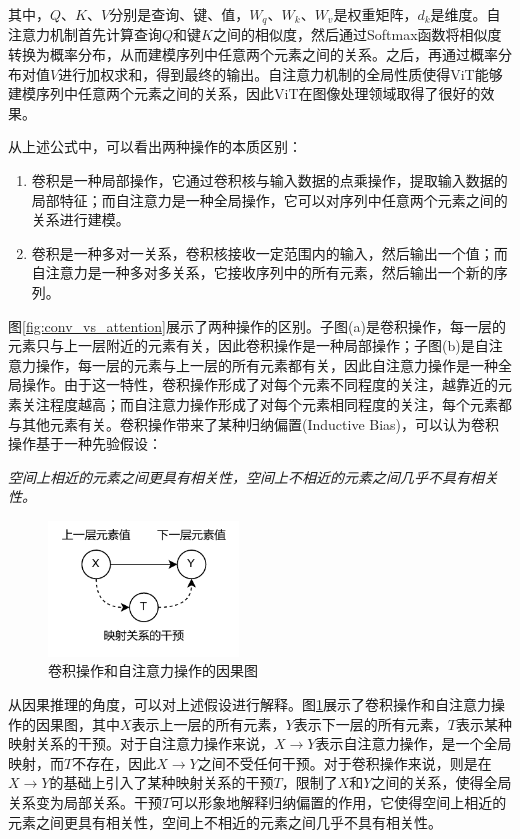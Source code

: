 其中，$Q$、$K$、$V$分别是查询、键、值，$W_q$、$W_k$、$W_v$是权重矩阵，$d_k$是维度。自注意力机制首先计算查询$Q$和键$K$之间的相似度，然后通过Softmax函数将相似度转换为概率分布，从而建模序列中任意两个元素之间的关系。之后，再通过概率分布对值$V$进行加权求和，得到最终的输出。自注意力机制的全局性质使得ViT能够建模序列中任意两个元素之间的关系，因此ViT在图像处理领域取得了很好的效果。

从上述公式中，可以看出两种操作的本质区别：

\begin{enumerate}
    \item 卷积是一种局部操作，它通过卷积核与输入数据的点乘操作，提取输入数据的局部特征；而自注意力是一种全局操作，它可以对序列中任意两个元素之间的关系进行建模。
    \item 卷积是一种多对一关系，卷积核接收一定范围内的输入，然后输出一个值；而自注意力是一种多对多关系，它接收序列中的所有元素，然后输出一个新的序列。
\end{enumerate}

图\ref{fig:conv_vs_attention}展示了两种操作的区别。子图(a)是卷积操作，每一层的元素只与上一层附近的元素有关，因此卷积操作是一种局部操作；子图(b)是自注意力操作，每一层的元素与上一层的所有元素都有关，因此自注意力操作是一种全局操作。由于这一特性，卷积操作形成了对每个元素不同程度的关注，越靠近的元素关注程度越高；而自注意力操作形成了对每个元素相同程度的关注，每个元素都与其他元素有关。卷积操作带来了某种归纳偏置(Inductive Bias)，可以认为卷积操作基于一种先验假设：

\textit{空间上相近的元素之间更具有相关性，空间上不相近的元素之间几乎不具有相关性。}

\begin{figure}[t]
    \centering
    \includegraphics[width=0.45\textwidth]{pics/causal inference.pdf}
    \caption{卷积操作和自注意力操作的因果图}
    \label{fig:causal_inference}
\end{figure}

从因果推理的角度，可以对上述假设进行解释。图\ref{fig:causal_inference}展示了卷积操作和自注意力操作的因果图，其中$X$表示上一层的所有元素，$Y$表示下一层的所有元素，$T$表示某种映射关系的干预。对于自注意力操作来说，$X \to Y$表示自注意力操作，是一个全局映射，而$T$不存在，因此$X \to Y$之间不受任何干预。对于卷积操作来说，则是在$X \to Y$的基础上引入了某种映射关系的干预$T$，限制了$X$和$Y$之间的关系，使得全局关系变为局部关系。干预$T$可以形象地解释归纳偏置的作用，它使得空间上相近的元素之间更具有相关性，空间上不相近的元素之间几乎不具有相关性。

